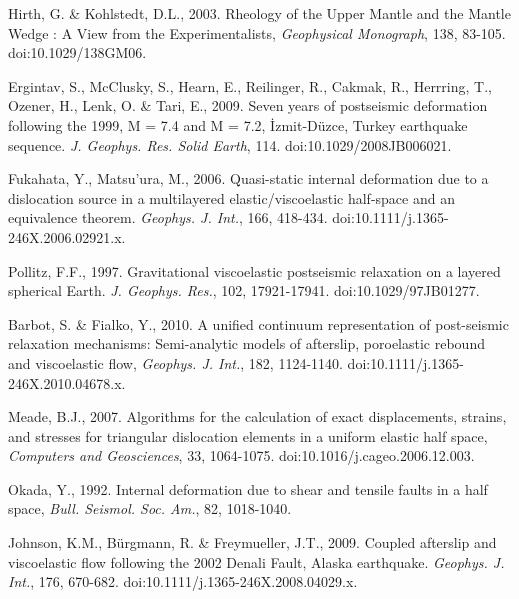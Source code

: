 \documentclass[extra]{gji}
\begin{document}
\begin{thebibliography}{}

 Hirth, G. \& Kohlstedt,
  D.L., 2003. Rheology of the Upper Mantle and the Mantle Wedge : A
  View from the Experimentalists, \textit{Geophysical Monograph}, 138,
  83-105. doi:10.1029/138GM06.

 Ergintav, S.,
  McClusky, S., Hearn, E., Reilinger, R., Cakmak, R., Herrring, T.,
  Ozener, H., Lenk, O. \& Tari, E., 2009. Seven years of postseismic
  deformation following the 1999, M = 7.4 and M = 7.2,
  \.Izmit-D\"uzce, Turkey earthquake
  sequence. \textit{J. Geophys. Res. Solid Earth},
  114. doi:10.1029/2008JB006021.

 Fukahata, Y.,
  Matsu’ura, M., 2006. Quasi-static internal deformation due to a
  dislocation source in a multilayered elastic/viscoelastic half-space
  and an equivalence theorem. \textit{Geophys. J. Int.}, 166,
  418-434. doi:10.1111/j.1365-246X.2006.02921.x.

 Pollitz, F.F.,
  1997. Gravitational viscoelastic postseismic relaxation on a layered
  spherical Earth. \textit{J. Geophys. Res.}, 102,
  17921-17941. doi:10.1029/97JB01277.

 Barbot, S. \&
  Fialko, Y., 2010. A unified continuum representation of post-seismic
  relaxation mechanisms: Semi-analytic models of afterslip,
  poroelastic rebound and viscoelastic flow, \textit{Geophys. J.
    Int.}, 182, 1124-1140. doi:10.1111/j.1365-246X.2010.04678.x.

 Meade, B.J., 2007. Algorithms for the
  calculation of exact displacements, strains, and stresses for
  triangular dislocation elements in a uniform elastic half space,
  \textit{Computers and Geosciences}, 33,
  1064-1075. doi:10.1016/j.cageo.2006.12.003.

 Okada, Y., 1992. Internal
  deformation due to shear and tensile faults in a half space,
  \textit{Bull. Seismol. Soc.  Am.}, 82, 1018-1040.

Johnson, K.M.,
  B\"urgmann, R. \& Freymueller, J.T., 2009. Coupled afterslip and
  viscoelastic flow following the 2002 Denali Fault, Alaska
  earthquake. \textit{Geophys. J.  Int.}, 176,
  670-682. doi:10.1111/j.1365-246X.2008.04029.x.


\end{thebibliography}
\end{document}
